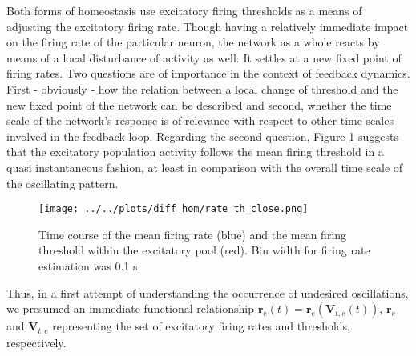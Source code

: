 \documentclass[10pt,a4paper]{article}
\begin{document}
Both forms of homeostasis use excitatory firing thresholds as a means of adjusting the excitatory firing rate. Though having a relatively immediate impact on the firing rate of the particular neuron, the network as a whole reacts by means of a local disturbance of activity as well: It settles at a new fixed point of firing rates. Two questions are of importance in the context of feedback dynamics. First - obviously - how the relation between a local change of threshold and the new fixed point of the network can be described and second, whether the time scale of the network's response is of relevance with respect to other time scales involved in the feedback loop. Regarding the second question, Figure \ref{rate_th_close} suggests that the excitatory population activity follows the mean firing threshold in a quasi instantaneous fashion, at least in comparison with the overall time scale of the oscillating pattern.
\begin{figure}
\begin{center}
\texttt{[image: ../../plots/diff\_hom/rate\_th\_close.png]}
\end{center}
\caption{Time course of the mean firing rate (blue) and the mean firing threshold within the excitatory pool (red). Bin width for firing rate estimation was 0.1 s.}
\label{rate_th_close}
\end{figure}
Thus, in a first attempt of understanding the occurrence of undesired oscillations, we presumed an immediate functional relationship $\mathbf{r}_e (t) = \mathbf{r}_e (\mathbf{V}_{t,e} (t))$, $\mathbf{r}_e$ and $\mathbf{V}_{t,e}$ representing the set of excitatory firing rates and thresholds, respectively.
\end{document}
